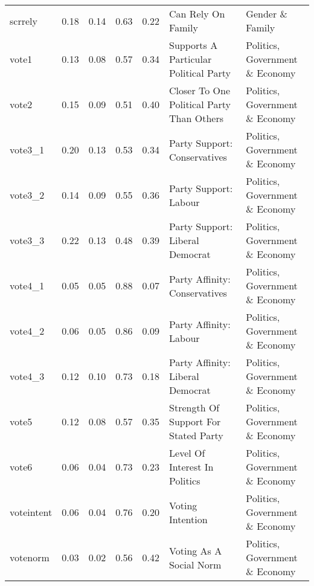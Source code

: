 \begin{longtable}{l|rrrrll}
scrrely & 0.18 & 0.14 & 0.63 & 0.22 & Can Rely On Family & Gender \& Family \\ 
vote1 & 0.13 & 0.08 & 0.57 & 0.34 & Supports A Particular Political Party & Politics, Government \& Economy \\ 
vote2 & 0.15 & 0.09 & 0.51 & 0.40 & Closer To One Political Party Than Others & Politics, Government \& Economy \\ 
vote3\_1 & 0.20 & 0.13 & 0.53 & 0.34 & Party Support: Conservatives & Politics, Government \& Economy \\ 
vote3\_2 & 0.14 & 0.09 & 0.55 & 0.36 & Party Support: Labour & Politics, Government \& Economy \\ 
vote3\_3 & 0.22 & 0.13 & 0.48 & 0.39 & Party Support: Liberal Democrat & Politics, Government \& Economy \\ 
vote4\_1 & 0.05 & 0.05 & 0.88 & 0.07 & Party Affinity: Conservatives & Politics, Government \& Economy \\ 
vote4\_2 & 0.06 & 0.05 & 0.86 & 0.09 & Party Affinity: Labour & Politics, Government \& Economy \\ 
vote4\_3 & 0.12 & 0.10 & 0.73 & 0.18 & Party Affinity: Liberal Democrat & Politics, Government \& Economy \\ 
vote5 & 0.12 & 0.08 & 0.57 & 0.35 & Strength Of Support For Stated Party & Politics, Government \& Economy \\ 
vote6 & 0.06 & 0.04 & 0.73 & 0.23 & Level Of Interest In Politics & Politics, Government \& Economy \\ 
voteintent & 0.06 & 0.04 & 0.76 & 0.20 & Voting Intention & Politics, Government \& Economy \\ 
votenorm & 0.03 & 0.02 & 0.56 & 0.42 & Voting As A Social Norm & Politics, Government \& Economy \\ 
\bottomrule
\end{longtable}

